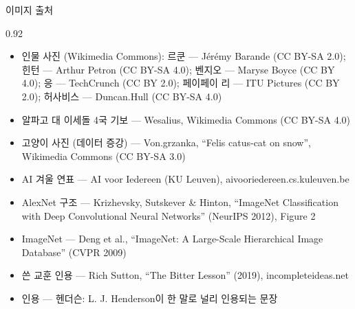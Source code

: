 \documentclass[aspectratio=169,11pt,t]{beamer}
\begin{document}

\begin{frame}{이미지 출처}
\begin{center}\begin{varwidth}{0.92\textwidth}
  \scriptsize
  \begin{itemize}
    \item 인물 사진 (Wikimedia Commons): 르쿤 --- Jérémy Barande (CC BY-SA 2.0); 힌턴 --- Arthur Petron (CC BY-SA 4.0);
      벤지오 --- Maryse Boyce (CC BY 4.0); 응 --- TechCrunch (CC BY 2.0); 페이페이 리 --- ITU Pictures (CC BY 2.0); 허사비스 --- Duncan.Hull (CC BY-SA 4.0)
    \item 알파고 대 이세돌 4국 기보 --- Wesalius, Wikimedia Commons (CC BY-SA 4.0)
    \item 고양이 사진 (데이터 증강) --- Von.grzanka, ``Felis catus-cat on snow'', Wikimedia Commons (CC BY-SA 3.0)
    \item AI 겨울 연표 --- AI voor Iedereen (KU Leuven), aivooriedereen.cs.kuleuven.be
    \item AlexNet 구조 --- Krizhevsky, Sutskever \& Hinton, ``ImageNet Classification with Deep Convolutional Neural Networks'' (NeurIPS 2012), Figure 2
    \item ImageNet --- Deng et al., ``ImageNet: A Large-Scale Hierarchical Image Database'' (CVPR 2009)
    \item 쓴 교훈 인용 --- Rich Sutton, ``The Bitter Lesson'' (2019), incompleteideas.net
    \item 인용 --- 헨더슨: L. J. Henderson이 한 말로 널리 인용되는 문장
  \end{itemize}
\end{varwidth}\end{center}
\end{frame}
\end{document}
